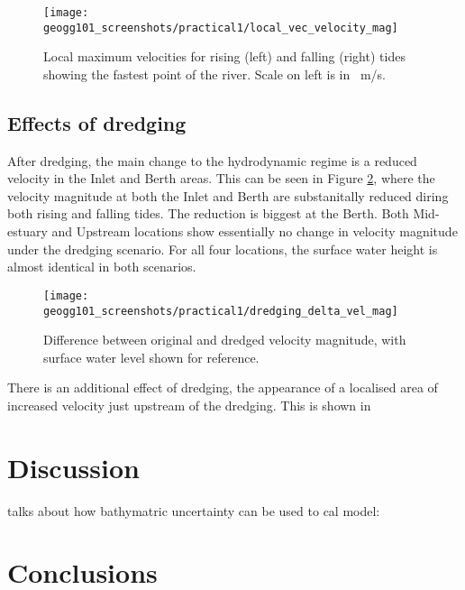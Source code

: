 \documentclass{article}
\begin{document}
\begin{figure}[!h]
    \centering
    \texttt{[image: geogg101\_screenshots/practical1/local\_vec\_velocity\_mag]}
    \caption{Local maximum velocities for rising (left) and falling (right) tides showing the fastest point of the river. Scale on left is in \SI{}{m/s}.}
    \label{fig:local_velocities}
\end{figure}

\subsection{Effects of dredging}

After dredging, the main change to the hydrodynamic regime is a reduced velocity in the Inlet and Berth areas. This can be seen in Figure \ref{fig:dredging_delta_vel_mag}, where the velocity magnitude at both the Inlet and Berth are substanitally reduced diring both rising and falling tides. The reduction is biggest at the Berth. Both Mid-estuary and Upstream locations show essentially no change in velocity magnitude under the dredging scenario. For all four locations, the surface water height is almost identical in both scenarios.

\begin{figure}[!h]
    \centering
    \texttt{[image: geogg101\_screenshots/practical1/dredging\_delta\_vel\_mag]}
    \caption{Difference between original and dredged velocity magnitude, with surface water level shown for reference.}
    \label{fig:dredging_delta_vel_mag}
\end{figure}

There is an additional effect of dredging, the appearance of a localised area of increased velocity just upstream of the dredging. This is shown in %

\newpage
\section{Discussion}

talks about how bathymatric uncertainty can be used to cal model: \textcite{cea2012bathymetric}

\section{Conclusions}

\printbibliography[filter=practical1]

\newpage
\setcounter{section}{0}
\end{document}
